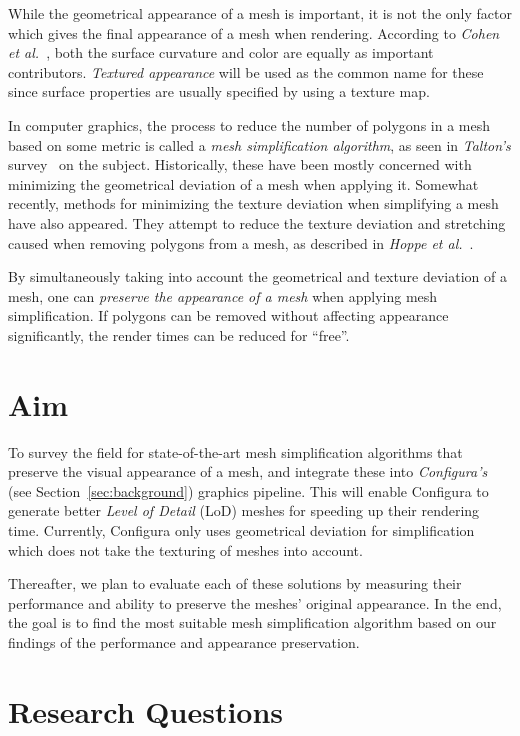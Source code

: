 While the geometrical appearance of a mesh is important, it is not the only factor which gives the final appearance of a mesh when rendering. According to \emph{Cohen et al.}~\cite{cohen1998appearance}, both the surface curvature and color are equally as important contributors. \emph{Textured appearance} will be used as the common name for these since surface properties are usually specified by using a texture map.

In computer graphics, the process to reduce the number of polygons in a mesh based on some metric is called a \emph{mesh simplification algorithm}, as seen in \emph{Talton's} survey~\cite{talton2004short} on the subject. Historically, these have been mostly concerned with minimizing the geometrical deviation of a mesh when applying it. Somewhat recently, methods for minimizing the texture deviation when simplifying a mesh have also appeared. They attempt to reduce the texture deviation and stretching caused when removing polygons from a mesh, as described in \emph{Hoppe et al.}~\cite{hoppe1996progressive}.

By simultaneously taking into account the geometrical and texture deviation of a mesh, one can \emph{preserve the appearance of a mesh} when applying mesh simplification. If polygons can be removed without affecting appearance significantly, the render times can be reduced for ``free''.

\section{Aim}
\label{sec:aim}

To survey the field for state-of-the-art mesh simplification algorithms that preserve the visual appearance of a mesh, and integrate these into \emph{Configura's} (see Section~\ref{sec:background}) graphics pipeline. This will enable Configura to generate better \emph{Level of Detail} (LoD) meshes for speeding up their rendering time. Currently, Configura only uses geometrical deviation for simplification which does not take the texturing of meshes into account.

Thereafter, we plan to evaluate each of these solutions by measuring their performance and ability to preserve the meshes' original appearance. In the end, the goal is to find the most suitable mesh simplification algorithm based on our findings of the performance and appearance preservation.

\section{Research Questions}
\label{sec:research-questions}

